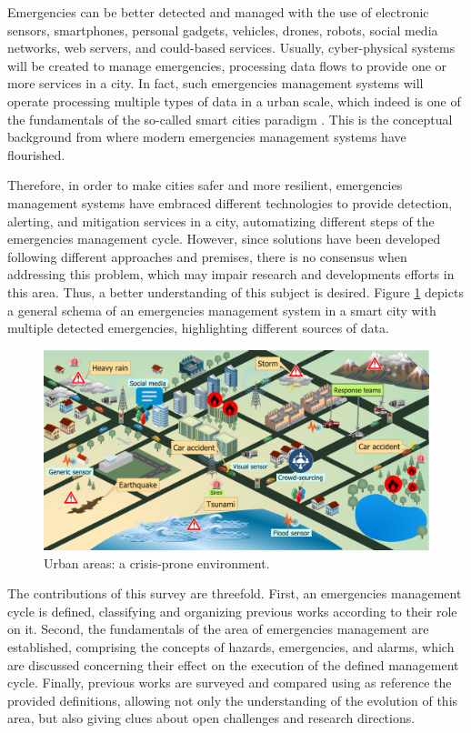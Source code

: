 \begin{refsection}
Emergencies can be better detected and managed with the use of electronic sensors, smartphones, personal gadgets, vehicles, drones, robots, social media networks, web servers, and could-based services. Usually, cyber-physical systems will be created to manage emergencies, processing data flows to provide one or more services in a city. In fact, such emergencies management systems will operate processing multiple types of data in a urban scale, which indeed is one of the fundamentals of the so-called smart cities paradigm \cite{smartcities4}. This is the conceptual background from where modern emergencies management systems have flourished.

Therefore, in order to make cities safer and more resilient, emergencies management systems have embraced different technologies to provide detection, alerting, and mitigation services in a city, automatizing different steps of the emergencies management cycle. However, since solutions have been developed following different approaches and premises, there is no consensus when addressing this problem, which may impair research and developments efforts in this area. Thus, a better understanding of this subject is desired. Figure \ref{Fig:general} depicts a general schema of an emergencies management system in a smart city with multiple detected emergencies, highlighting different sources of data.

\begin{figure}[htbp]
\centering
\includegraphics[scale=0.35]{Chapters/1-Survey/images/general.pdf}
\caption{Urban areas: a crisis-prone environment.}\label{Fig:general}
\end{figure}

The contributions of this survey are threefold. First, an emergencies management cycle is defined, classifying and organizing previous works according to their role on it. Second, the fundamentals of the area of emergencies management are established, comprising the concepts of hazards, emergencies, and alarms, which are discussed concerning their effect on the execution of the defined management cycle. Finally, previous works are surveyed and compared using as reference the provided definitions, allowing not only the understanding of the evolution of this area, but also giving clues about open challenges and research directions.


\end{refsection}

